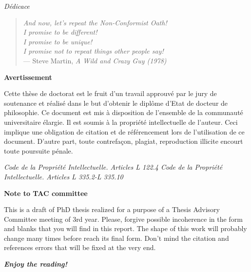 \documentclass[12pt,]{book}
\theoremstyle{definition}
\theoremstyle{definition}
\theoremstyle{definition}
\theoremstyle{remark}
\begin{document}
\begin{titlepage}
\newpage
\emph{Dédicace}
\vspace*{\fill}

 \begin{quote}

\emph{And now, let's repeat the Non-Conformist Oath!}\\
\vskip 0.5cm
\noindent
\emph{I promise to be different!}\\
\noindent
\vspace*{0.5cm}
\emph{I promise to be unique!}\\
\noindent
\vspace*{0.5cm}
\emph{I promise not to repeat things other people say!}\\
\noindent
\vspace*{0.5cm}
— Steve Martin, \textit{A Wild and Crazy Guy (1978)}\\
 \end{quote}
 \vspace*{\fill}


\newpage
\thispagestyle{empty}
\begin{center}
\large{\textbf{Avertissement}}
\end{center}
\vspace{2cm}
Cette thèse de doctorat est le fruit d’un travail approuvé par le jury de soutenance et
réalisé dans le but d’obtenir le diplôme d’Etat de docteur de philosophie. Ce document
est mis à disposition de l’ensemble de la communauté universitaire élargie.
Il est soumis à la propriété intellectuelle de l’auteur. Ceci implique une obligation de
citation et de référencement lors de l’utilisation de ce document.
D’autre part, toute contrefaçon, plagiat, reproduction illicite encourt toute poursuite
pénale.
\vspace*{\fill}

\emph{Code de la Propriété Intellectuelle. Articles L 122.4 \newline
Code de la Propriété Intellectuelle. Articles L 335.2-L 335.10}


\newpage
\thispagestyle{empty}
\begin{center}
\large{\textbf{Note to TAC committee}}
\end{center}
\vspace{2cm}
This is a draft of PhD thesis realized for a purpose of a Thesis Advisory Committee meeting of 3rd year. Please, forgive possible incoherence in the form and blanks that you will find in this report. The shape of this work will probably change many times before reach its final form. Don't mind the citation and references errors that will be fixed at the very end. 

\emph{\textbf{Enjoy the reading!}}

\end{titlepage}
\end{document}
